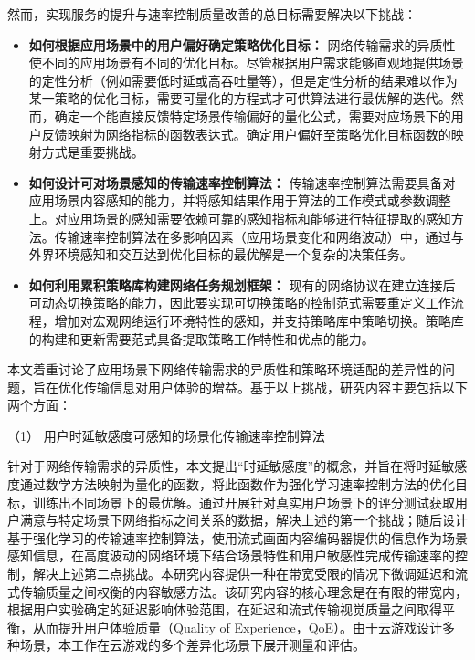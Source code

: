 然而，实现服务的提升与速率控制质量改善的总目标需要解决以下挑战：
\begin{itemize}
    \item \textbf{如何根据应用场景中的用户偏好确定策略优化目标：} 网络传输需求的异质性使不同的应用场景有不同的优化目标。尽管根据用户需求能够直观地提供场景的定性分析（例如需要低时延或高吞吐量等），但是定性分析的结果难以作为某一策略的优化目标，需要可量化的方程式才可供算法进行最优解的迭代。然而，确定一个能直接反馈特定场景传输偏好的量化公式，需要对应场景下的用户反馈映射为网络指标的函数表达式。确定用户偏好至策略优化目标函数的映射方式是重要挑战。
    
    \item \textbf{如何设计可对场景感知的传输速率控制算法：} 传输速率控制算法需要具备对应用场景内容感知的能力，并将感知结果作用于算法的工作模式或参数调整上。对应用场景的感知需要依赖可靠的感知指标和能够进行特征提取的感知方法。传输速率控制算法在多影响因素（应用场景变化和网络波动）中，通过与外界环境感知和交互达到优化目标的最优解是一个复杂的决策任务。

    \item \textbf{如何利用累积策略库构建网络任务规划框架：} 现有的网络协议在建立连接后可动态切换策略的能力，因此要实现可切换策略的控制范式需要重定义工作流程，增加对宏观网络运行环境特性的感知，并支持策略库中策略切换。策略库的构建和更新需要范式具备提取策略工作特性和优点的能力。
    
\end{itemize}

本文着重讨论了应用场景下网络传输需求的异质性和策略环境适配的差异性的问题，旨在优化传输信息对用户体验的增益。基于以上挑战，研究内容主要包括以下两个方面：

（1） 用户时延敏感度可感知的场景化传输速率控制算法

针对于网络传输需求的异质性，本文提出“时延敏感度”的概念，并旨在将时延敏感度通过数学方法映射为量化的函数，将此函数作为强化学习速率控制方法的优化目标，训练出不同场景下的最优解。通过开展针对真实用户场景下的评分测试获取用户满意与特定场景下网络指标之间关系的数据，解决上述的第一个挑战；随后设计基于强化学习的传输速率控制算法，使用流式画面内容编码器提供的信息作为场景感知信息，在高度波动的网络环境下结合场景特性和用户敏感性完成传输速率的控制，解决上述第二点挑战。本研究内容提供一种在带宽受限的情况下微调延迟和流式传输质量之间权衡的内容敏感方法。该研究内容的核心理念是在有限的带宽内，根据用户实验确定的延迟影响体验范围，在延迟和流式传输视觉质量之间取得平衡，从而提升用户体验质量（Quality of Experience，QoE）。由于云游戏设计多种场景，本工作在云游戏的多个差异化场景下展开测量和评估。

